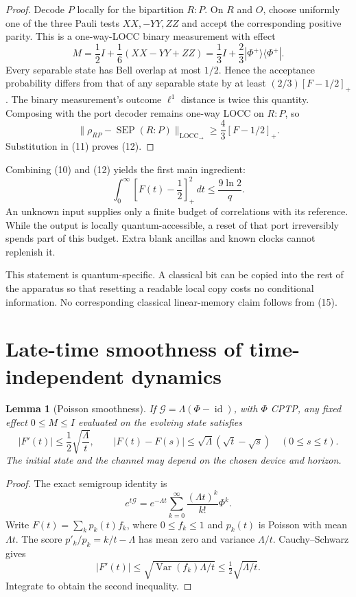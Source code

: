 \documentclass[11pt]{article}
\newtheorem{lemma}[theorem]{Lemma}
\newcommand{\id}{\operatorname{id}}
\newcommand{\SEP}{\operatorname{SEP}}
\newcommand{\locc}{\operatorname{LOCC}_{\to}}
\newcommand{\G}{\mathcal G}
\begin{document}
\begin{proof}
Decode \(P\) locally for the bipartition \(R:P\). On \(R\) and \(O\),
choose uniformly one of the three Pauli tests \(XX,-YY,ZZ\) and accept
the corresponding positive parity. This is a one-way-LOCC binary
measurement with effect
\[
 M=\frac12 I+\frac16(XX-YY+ZZ)
      =\frac13 I+\frac23|\Phi^+\rangle\langle\Phi^+|.
 \tag{13}
\]
Every separable state has Bell overlap at most \(1/2\). Hence the
acceptance probability differs from that of any separable state by
at least \((2/3)[F-1/2]_+\). The binary measurement's outcome
\(\ell^1\) distance is twice this quantity. Composing with the port
decoder remains one-way LOCC on \(R:P\), so
\[
 \|\rho_{RP}-\SEP(R:P)\|_{\locc}
       \geq\frac43[F-1/2]_+.
 \tag{14}
\]
Substitution in (11) proves (12).
\end{proof}

Combining (10) and (12) yields the first main ingredient:
\[
 \boxed{\qquad
 \int_0^\infty\left[F(t)-\frac12\right]_+^2\,dt
        \leq\frac{9\ln2}{q}.
 \qquad}
 \tag{15}
\]
An unknown input supplies only a finite budget of correlations with
its reference. While the output is locally quantum-accessible, a reset
of that port irreversibly spends part of this budget. Extra blank
ancillas and known clocks cannot replenish it.

This statement is quantum-specific. A classical bit can be copied into
the rest of the apparatus so that resetting a readable local copy costs
no conditional information. No corresponding classical linear-memory
claim follows from (15).

\section{Late-time smoothness of time-independent dynamics}

\begin{lemma}[Poisson smoothness]\label{lem:smooth}
If \(\G=\Lambda(\Phi-\id)\), with \(\Phi\) CPTP, any fixed effect
\(0\leq M\leq I\) evaluated on the evolving state satisfies
\[
 |F'(t)|\leq\frac12\sqrt{\frac{\Lambda}{t}},
 \qquad
 |F(t)-F(s)|\leq\sqrt{\Lambda}(\sqrt t-\sqrt s)
 \quad(0\leq s\leq t).
 \tag{16}
\]
The initial state and the channel may depend on the chosen device and
horizon.
\end{lemma}

\begin{proof}
The exact semigroup identity is
\[
 e^{t\G}=e^{-\Lambda t}
       \sum_{k=0}^\infty\frac{(\Lambda t)^k}{k!}\Phi^k.
 \tag{17}
\]
Write \(F(t)=\sum_k p_k(t)f_k\), where \(0\leq f_k\leq1\) and
\(p_k(t)\) is Poisson with mean \(\Lambda t\).
The score \(p'_k/p_k=k/t-\Lambda\) has mean zero and variance
\(\Lambda/t\). Cauchy--Schwarz gives
\[
 |F'(t)|\leq
 \sqrt{\operatorname{Var}(f_k)\Lambda/t}
 \leq\tfrac12\sqrt{\Lambda/t}.
\]
Integrate to obtain the second inequality.
\end{proof}
\end{document}
